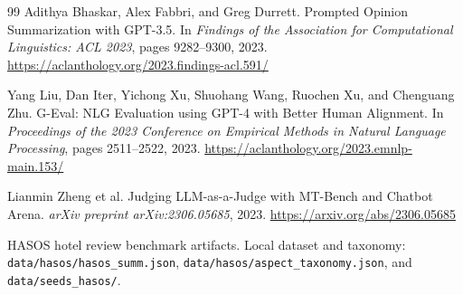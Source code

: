 \documentclass[12pt,a4paper]{report}
\begin{document}
\begin{thebibliography}{99}
Adithya Bhaskar, Alex Fabbri, and Greg Durrett.
\newblock Prompted Opinion Summarization with GPT-3.5.
\newblock In \textit{Findings of the Association for Computational Linguistics: ACL 2023}, pages 9282--9300, 2023.
\newblock \url{https://aclanthology.org/2023.findings-acl.591/}

Yang Liu, Dan Iter, Yichong Xu, Shuohang Wang, Ruochen Xu, and Chenguang Zhu.
\newblock G-Eval: NLG Evaluation using GPT-4 with Better Human Alignment.
\newblock In \textit{Proceedings of the 2023 Conference on Empirical Methods in Natural Language Processing}, pages 2511--2522, 2023.
\newblock \url{https://aclanthology.org/2023.emnlp-main.153/}

Lianmin Zheng et al.
\newblock Judging LLM-as-a-Judge with MT-Bench and Chatbot Arena.
\newblock \textit{arXiv preprint arXiv:2306.05685}, 2023.
\newblock \url{https://arxiv.org/abs/2306.05685}

HASOS hotel review benchmark artifacts.
\newblock Local dataset and taxonomy: \texttt{data/hasos/hasos\_summ.json}, \texttt{data/hasos/aspect\_taxonomy.json}, and \texttt{data/seeds\_hasos/}.

\end{thebibliography}
\end{document}

